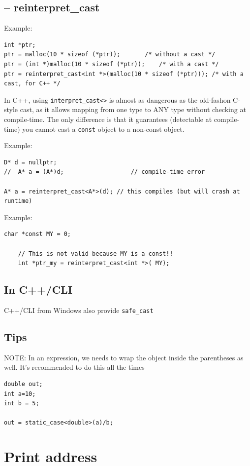 \subsection{-- reinterpret\_cast}
\label{sec:reinterpret_cast}


Example:
\begin{verbatim}
int *ptr;
ptr = malloc(10 * sizeof (*ptr));		/* without a cast */
ptr = (int *)malloc(10 * sizeof (*ptr));	/* with a cast */
ptr = reinterpret_cast<int *>(malloc(10 * sizeof (*ptr))); /* with a cast, for C++ */
\end{verbatim}


In C++, using \verb!interpret_cast<>! is almost as dangerous as the old-fashon
C-style cast, as it allows mapping from one type to ANY type without checking at
compile-time. The only difference is that it guarantees (detectable at
compile-time) you cannot cast a \verb!const! object to a non-const object.

Example:
\begin{verbatim}
D* d = nullptr;
//  A* a = (A*)d;                   // compile-time error

A* a = reinterpret_cast<A*>(d); // this compiles (but will crash at runtime)
\end{verbatim}

Example:
\begin{verbatim}
char *const MY = 0;

	// This is not valid because MY is a const!!
	int *ptr_my = reinterpret_cast<int *>( MY);
\end{verbatim}

\subsection{In C++/CLI}

C++/CLI from Windows also provide \verb!safe_cast!

\subsection{Tips}

NOTE: In an expression, we needs to wrap the object inside the parentheses as
well. It's recommended to do this all the times
\begin{verbatim}
double out;
int a=10; 
int b = 5;

out = static_case<double>(a)/b;
\end{verbatim}


\section{Print address}
\label{sec:print-address}


